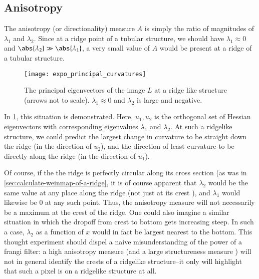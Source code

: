 \subsection{Anisotropy} \label{sec:frangi.anisotropy}
The anisotropy (or directionality) measure $A$ is simply the ratio of magnitudes of $\lambda_1$ and $\lambda_2$. Since at a ridge point of a tubular structure, we should have $\lambda_1 \approx 0$ and $\abs{\lambda_2} \gg \abs{\lambda_1}$,
a very small value of $A$ would be present at a ridge of a tubular structure.

\begin{figure}[h] \label{fig:expo-principal-curvatures}
	\begin{center}
\texttt{[image: expo\_principal\_curvatures]}
\caption{The principal eigenvectors of the image $L$ at a ridge like structure (arrows not to scale). $\lambda_1 \approx 0$ and $\lambda_2$ is large and negative. }
\end{center}
\end{figure}

In \cref{fig:expo-principal-curvatures}, this situation is demonstrated. Here, $u_1, u_2$ is the orthogonal set of Hessian eigenvectors with corresponding eigenvalues $\lambda_1$ and $\lambda_2$. At such a ridgelike structure, we could predict the largest change in curvature to be straight down the ridge (in the direction of $u_2$), and the direction of least curvature to be directly along the ridge (in the direction  of $u_1$).

Of course, if the the ridge is perfectly circular along its cross section (as was in \cref{sec:calculate-weinmap-of-a-ridge}, it is of course apparent that $\lambda_2$ would be the same value at any place along the ridge (not just at its crest ), and $\lambda_1$ would likewise be 0 at any such point. Thus, the anisotropy measure will not necessarily be a maximum at the crest of the ridge. One could also imagine a similar situation in which the dropoff from crest to bottom gets increasing steep. In such a case, $\lambda_2$ as a function of $x$ would in fact be largest nearest to the bottom. This thought experiment should dispel a naive misunderstanding of the power of a frangi filter: a high anisotropy measure (and a large structureness measure ) will not in general identify the crests of a ridgelike structure--it only will highlight that such a pixel is on a ridgelike structure at all.


